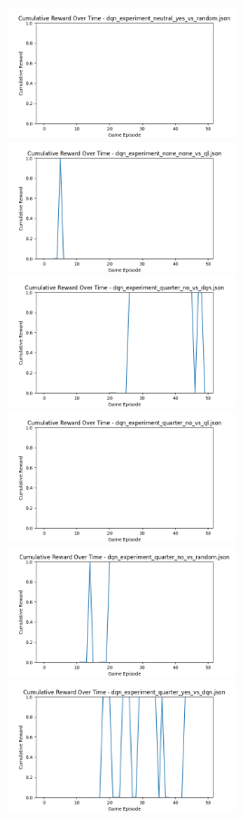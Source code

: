 \includegraphics[width=0.5\textwidth]{images/cumulative_reward_dqn_experiment_neutral_yes_vs_random.png} 
\includegraphics[width=0.5\textwidth]{images/cumulative_reward_dqn_experiment_none_none_vs_ql.png} 
\includegraphics[width=0.5\textwidth]{images/cumulative_reward_dqn_experiment_quarter_no_vs_dqn.png} 
\includegraphics[width=0.5\textwidth]{images/cumulative_reward_dqn_experiment_quarter_no_vs_ql.png} 
\includegraphics[width=0.5\textwidth]{images/cumulative_reward_dqn_experiment_quarter_no_vs_random.png} 
\includegraphics[width=0.5\textwidth]{images/cumulative_reward_dqn_experiment_quarter_yes_vs_dqn.png} 
